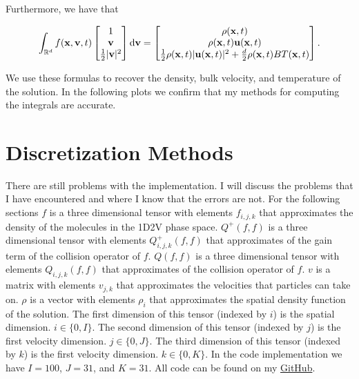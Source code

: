 \documentclass{article}
\def\b{\mathbf}
\def\t{\text}
\begin{document}
Furthermore, we have that

\[
    \int_{\mathbb{R}^d} f(\b x, \b v, t)
    \begin{bmatrix}
        1 \\
        \b v \\
        \frac{1}{2} |\b v|^2
    \end{bmatrix}
    \t d \b v
    =
    \begin{bmatrix}
        \rho(\b x, t)\\
        \rho(\b x, t) \b u(\b x, t)\\
        \frac{1}{2} \rho(\b x, t) |\b u(\b x, t)|^2 + \frac{d}{2} \rho(\b x, t) B T(\b x, t)
    \end{bmatrix}.
\]

We use these formulas to recover the density, bulk velocity, and temperature of the solution. In the following plots we confirm that my methods for computing the integrals are accurate.

\section{Discretization Methods}
There are still problems with the implementation. I will discuss the problems that I have encountered and where I know that the errors are not. For the following sections $f$ is a three dimensional tensor with elements $f_{i,j,k}$ that approximates the density of the molecules in the 1D2V phase space. $Q^+(f,f)$ is a three dimensional tensor with elements $Q^+_{i,j,k}(f,f)$ that approximates of the gain term of the collision operator of $f$. $Q(f,f)$ is a three dimensional tensor with elements $Q_{i,j,k}(f,f)$ that approximates of the collision operator of $f$. $v$ is a matrix with elements $v_{j,k}$ that approximates the velocities that particles can take on. $\rho$ is a vector with elements $\rho_i$ that approximates the spatial density function of the solution. The first dimension of this tensor (indexed by $i$) is the spatial dimension. $i \in \{0,I\}$. The second dimension of this tensor (indexed by $j$) is the first velocity dimension. $j \in \{0,J\}$. The third dimension of this tensor (indexed by $k$) is the first velocity dimension. $k \in \{0,K\}$. In the code implementation we have $I=100$, $J=31$, and $K=31$. All code can be found on my \href{https://github.com/damienbeecroft}{GitHub}.
\end{document}
